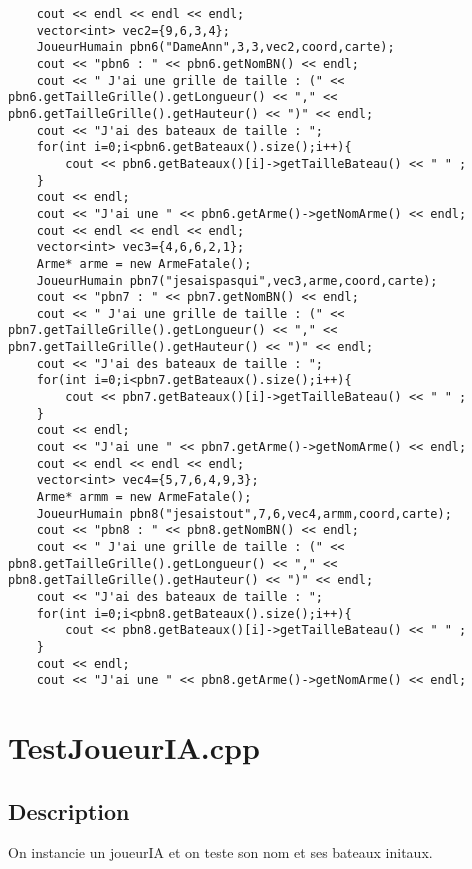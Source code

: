 \begin{lstlisting}
	cout << endl << endl << endl;
	vector<int> vec2={9,6,3,4};
	JoueurHumain pbn6("DameAnn",3,3,vec2,coord,carte);
	cout << "pbn6 : " << pbn6.getNomBN() << endl;
	cout << " J'ai une grille de taille : (" << pbn6.getTailleGrille().getLongueur() << "," << pbn6.getTailleGrille().getHauteur() << ")" << endl;
	cout << "J'ai des bateaux de taille : ";
	for(int i=0;i<pbn6.getBateaux().size();i++){
		cout << pbn6.getBateaux()[i]->getTailleBateau() << " " ;
	}
	cout << endl;
	cout << "J'ai une " << pbn6.getArme()->getNomArme() << endl;
	cout << endl << endl << endl;
	vector<int> vec3={4,6,6,2,1};
	Arme* arme = new ArmeFatale();
	JoueurHumain pbn7("jesaispasqui",vec3,arme,coord,carte);
	cout << "pbn7 : " << pbn7.getNomBN() << endl;
	cout << " J'ai une grille de taille : (" << pbn7.getTailleGrille().getLongueur() << "," << pbn7.getTailleGrille().getHauteur() << ")" << endl;
	cout << "J'ai des bateaux de taille : ";
	for(int i=0;i<pbn7.getBateaux().size();i++){
		cout << pbn7.getBateaux()[i]->getTailleBateau() << " " ;
	}
	cout << endl;
	cout << "J'ai une " << pbn7.getArme()->getNomArme() << endl;
	cout << endl << endl << endl;
	vector<int> vec4={5,7,6,4,9,3};
	Arme* armm = new ArmeFatale();
	JoueurHumain pbn8("jesaistout",7,6,vec4,armm,coord,carte);
	cout << "pbn8 : " << pbn8.getNomBN() << endl;	
	cout << " J'ai une grille de taille : (" << pbn8.getTailleGrille().getLongueur() << "," << pbn8.getTailleGrille().getHauteur() << ")" << endl;
	cout << "J'ai des bateaux de taille : ";
	for(int i=0;i<pbn8.getBateaux().size();i++){
		cout << pbn8.getBateaux()[i]->getTailleBateau() << " " ;
	}
	cout << endl;
	cout << "J'ai une " << pbn8.getArme()->getNomArme() << endl;
	\end{lstlisting}
    \section{TestJoueurIA.cpp}
        \subsection{Description}
        On instancie un joueurIA et on teste son nom et ses bateaux initaux.

